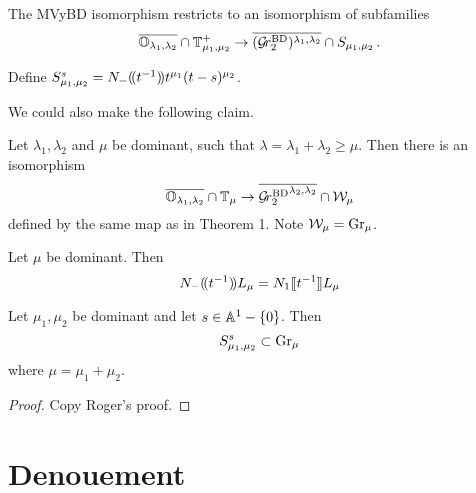 \documentclass{article}
\begin{document}
\begin{corollary}
    The MVyBD isomorphism restricts to an isomorphism of subfamilies 
    \begin{equation}
        \overline{\OO_{\lambda_1,\lambda_2}}\cap\TT_{\mu_1,\mu_2}^+ \to \overline{(\Grbd[2])^{\lambda_1,\lambda_2}}\cap S_{\mu_1,\mu_2}\,. 
    \end{equation}
\end{corollary}

Define $S_{\mu_1,\mu_2}^s = N_-\xT[t^{-1}] t^{\mu_1} (t-s)^{\mu_2}$. 


We could also make the following claim. 
\begin{theorem}
    Let $\lambda_1,\lambda_2$ and $\mu$ be dominant, such that $\lambda = \lambda_1 + \lambda_2 \ge \mu$. Then there is an isomorphism 
    \begin{equation}
        \overline{\OO_{\lambda_1,\lambda_2}} \cap \TT_\mu \to \overline{\Grbd[2]^{\lambda_2,\lambda_2}}\cap\cW_\mu 
    \end{equation}
    defined by the same map as in Theorem 1. 
    Note $\cW_\mu = \Gr_\mu$. 
\end{theorem}

\begin{lemma}[KWWY14]
    Let $\mu$ be dominant. Then 
    \begin{equation}
        N_{-}\xT[t^{-1}] L_\mu = N_1\xt[t^{-1}]L_\mu
    \end{equation}
\end{lemma}

\begin{lemma}%
    Let $\mu_1,\mu_2$ be dominant and let $s\in \AA^1 - \{0\}$. Then 
    \begin{equation}
        S_{\mu_1,\mu_2}^s \subset \Gr_\mu 
    \end{equation}
    where $\mu = \mu_1 + \mu_2$.
\end{lemma}

\begin{proof}
    Copy Roger's proof.
\end{proof}

\section{Denouement}
\end{document}
